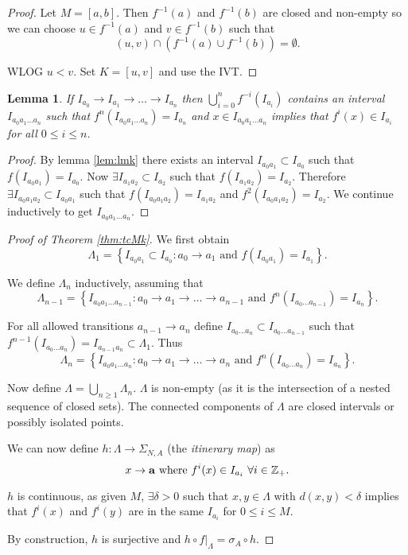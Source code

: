 \documentclass{notes}
\theoremstyle{plain}
\newtheorem{lemma}[proposition]{Lemma}
\begin{document}
\begin{proof}
Let $M = [a,b]$.  Then $f^{-1}(a)$ and $f^{-1}(b)$ are closed and non-empty
so we can choose $u \in f^{-1}(a)$ and $v \in f^{-1}(b)$ such that
\[
(u,v) \cap \left( f^{-1}(a) \cup f^{-1}(b) \right) = \emptyset.
\]

WLOG $u < v$.  Set $K = [u,v]$ and use the IVT.
\end{proof}

\begin{lemma}\label{lem:nint}
If $I_{a_0} \to I_{a_1} \to \dots \to I_{a_n}$ then $\bigcup_{i=0}^n
f^{-i}(I_{a_i})$ contains an interval $I_{a_0 a_1 \dots a_n}$ such that
$f^n( I_{a_0 a_1 \dots a_n} ) = I_{a_n}$ and $x \in I_{a_0 a_1 \dots a_n}$
implies that $f^i(x) \in I_{a_i}$ for all $0 \le i \le n$.
\end{lemma}

\begin{proof}
By lemma \ref{lem:lmk} there exists an interval $I_{a_0 a_1} \subset I_{a_0}$
such that $f(I_{a_0 a_1}) = I_{a_0}$.  Now $\exists I_{a_1 a_2} \subset
I_{a_2}$ such that $f(I_{a_1 a_2}) = I_{a_2}$.  Therefore
$\exists I_{a_0 a_1 a_2} \subset I_{a_0 a_1}$ such that
$f(I_{a_0 a_1 a_2}) = I_{a_1 a_2}$ and $f^2(I_{a_0 a_1 a_2}) = I_{a_2}$.
We continue inductively to get $I_{a_0 a_1 \dots a_n}$.
\end{proof}

\begin{proof}[Proof of Theorem \ref{thm:tcMk}]
We first obtain
\[
\Lambda_1 = \left\{ I_{a_0 a_1} \subset I_{a_0} : a_0 \to a_1 \text{ and }
f(I_{a_0 a_1}) = I_{a_1} \right\}.
\]

We define $\Lambda_n$ inductively, assuming that
\[
\Lambda_{n-1} = \left\{ I_{a_0 a_1 \dots a_{n-1}}
: a_0 \to a_1 \to \dots \to a_{n-1} \text{ and }
f^n(I_{a_0 \dots a_{n-1}}) = I_{a_n} \right\}.
\]

For all allowed transitions $a_{n-1} \to a_n$ define
$I_{a_0 \dots a_n} \subset I_{a_0 \dots a_{n-1}}$ such that
$f^{n-1}(I_{a_0 \dots a_n}) = I_{a_{n-1} a_n} \subset \Lambda_1$.
Thus
\[
\Lambda_{n} = \left\{ I_{a_0 a_1 \dots a_n}
: a_0 \to a_1 \to \dots \to a_n \text{ and }
f^n(I_{a_0 \dots a_n}) = I_{a_n} \right\}.
\]

Now define $\Lambda = \bigcup_{n \ge 1} \Lambda_n$.  $\Lambda$ is
non-empty (as it is the intersection of a nested sequence of closed sets).
The connected components of $\Lambda$ are closed intervals or possibly
isolated points.

We can now define $h\colon \Lambda \to \Sigma_{N,A}$ (the
\emph{itinerary map}) as
\[
x \to \mathbf{a} \text{ where } f^i(x) \in I_{a_i}\ \forall i \in \mathbb{Z}_+.
\]

$h$ is continuous, as given $M$, $\exists \delta > 0$ such that $x,y
\in \Lambda$ with $d(x,y) < \delta$ implies that
$f^i(x)$ and $f^i(y)$ are in the same $I_{a_i}$ for $0 \le i \le M$.

By construction, $h$ is surjective and $h \circ \left.f\right|_\Lambda
= \sigma_A \circ h$.
\end{proof}
\end{document}
